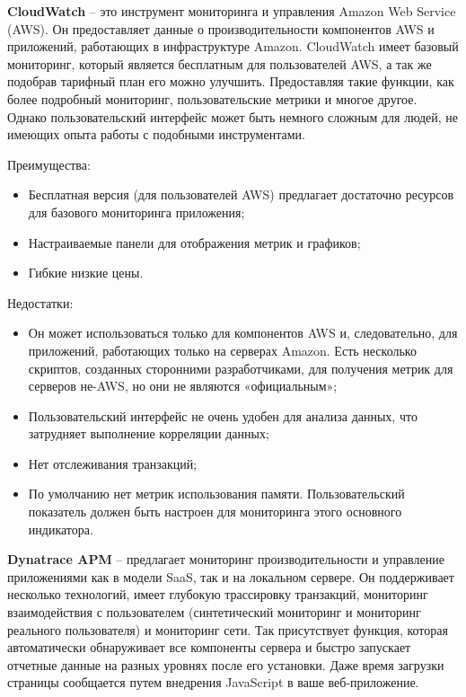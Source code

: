 \textbf{CloudWatch} – это инструмент мониторинга и управления Amazon Web Service (AWS). Он предоставляет данные о производительности компонентов AWS и приложений, работающих в инфраструктуре Amazon. CloudWatch имеет базовый мониторинг, который является бесплатным для пользователей AWS, а так же подобрав тарифный план его можно улучшить. Предоставляя такие функции, как более подробный мониторинг, пользовательские метрики и многое другое. Однако пользовательский интерфейс может быть немного сложным для людей, не имеющих опыта работы с подобными инструментами.\cite{AmazonCl81:online}

Преимущества:
\begin{itemize}
	\item Бесплатная версия (для пользователей AWS) предлагает достаточно ресурсов для базового мониторинга приложения;
	\item Настраиваемые панели для отображения метрик и графиков;
	\item Гибкие низкие цены.
\end{itemize}

Недостатки:
\begin{itemize}
	\item Он может использоваться только для компонентов AWS и, следовательно, для приложений, работающих только на серверах Amazon. Есть несколько скриптов, созданных сторонними разработчиками, для получения метрик для серверов не-AWS, но они не являются «официальным»;
	\item Пользовательский интерфейс не очень удобен для анализа данных, что затрудняет выполнение корреляции данных;
	\item Нет отслеживания транзакций;
	\item По умолчанию нет метрик использования памяти. Пользовательский показатель должен быть настроен для мониторинга этого основного индикатора.
\end{itemize}

\textbf{Dynatrace APM} – предлагает мониторинг производительности и управление приложениями как в модели SaaS, так и на локальном сервере. Он поддерживает несколько технологий, имеет глубокую трассировку транзакций, мониторинг взаимодействия с пользователем (синтетический мониторинг и мониторинг реального пользователя) и мониторинг сети. Так присутствует функция, которая автоматически обнаруживает все компоненты сервера и быстро запускает отчетные данные на разных уровнях после его установки. Даже время загрузки страницы сообщается путем внедрения JavaScript в ваше веб-приложение.\cite{Applicat35:online}

